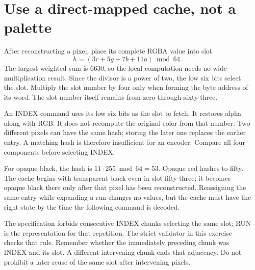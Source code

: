 \section{Use a direct-mapped cache, not a palette}
After reconstructing a pixel, place its complete RGBA value into slot
\[
h=(3r+5g+7b+11a)\bmod64.
\]
The largest weighted sum is 6630, so the local computation needs no wide multiplication
result. Since the divisor is a power of two, the low six bits select the slot. Multiply
the slot number by four only when forming the byte address of its word. The slot number
itself remains from zero through sixty-three.

An INDEX command uses its low six bits as the slot to fetch. It restores alpha along
with RGB. It does not recompute the original color from that number. Two different
pixels can have the same hash; storing the later one replaces the earlier entry.
A matching hash is therefore insufficient for an encoder. Compare all four components
before selecting INDEX.

For opaque black, the hash is \(11\cdot255\bmod64=53\). Opaque red hashes to fifty.
The cache begins with transparent black even in slot fifty-three; it becomes opaque
black there only after that pixel has been reconstructed. Reassigning the same entry
while expanding a run changes no values, but the cache must have the right state by
the time the following command is decoded.

The specification forbids consecutive INDEX chunks selecting the same slot; RUN is
the representation for that repetition. The strict validator in this exercise checks
that rule. Remember whether the immediately preceding chunk was INDEX and its slot.
A different intervening chunk ends that adjacency. Do not prohibit a later reuse of
the same slot after intervening pixels.
